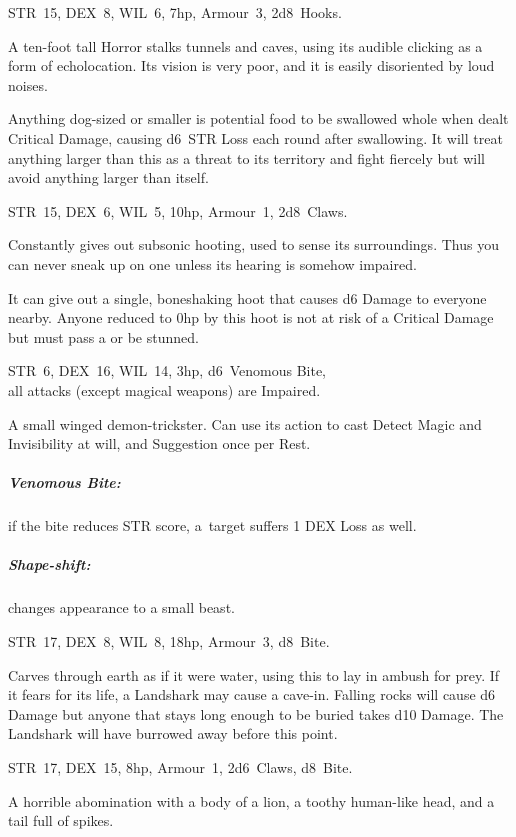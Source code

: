 \documentclass[itdr]{subfiles}
\begin{document}
\vfill

STR~15, DEX~8, WIL~6, 7hp, Armour~3, 2d8~Hooks.

A ten-foot tall Horror stalks tunnels and caves, using its audible clicking as a form of echolocation. Its vision is very poor, and it is easily disoriented by loud noises.

Anything dog-sized or smaller is potential food to be swallowed whole when dealt Critical Damage, causing d6~STR Loss each round after swallowing. It will treat anything larger than this as a threat to its territory and fight fiercely but will avoid anything larger than itself.

\vfill

STR~15, DEX~6, WIL~5, 10hp, Armour~1, 2d8~Claws.

Constantly gives out subsonic hooting, used to sense its surroundings. Thus you can never sneak up on one unless its hearing is somehow impaired.

It can give out a single, boneshaking hoot that causes d6 Damage to everyone nearby. Anyone reduced to 0hp by this hoot is not at risk of a Critical Damage but must pass a  or be stunned.

\vfill

STR~6, DEX~16, WIL~14, 3hp, d6~Venomous Bite,\\all attacks (except magical weapons) are Impaired.

A small winged demon-trickster. Can use its action to cast Detect Magic and Invisibility at will, and Suggestion once per Rest.

\subparagraph{Venomous Bite:} if the bite reduces STR score, \mbox{a target} suffers 1 DEX Loss as well.

\subparagraph{Shape-shift:} changes appearance to a small beast.

\vfill
\break

STR~17, DEX~8, WIL~8, 18hp, Armour~3, d8~Bite.

Carves through earth as if it were water, using this to lay in ambush for prey. If it fears for its life, a Landshark may cause a cave-in. Falling rocks will cause d6 Damage but anyone that stays long enough to be buried takes d10 Damage. The Landshark will have burrowed away before this point.

\vfill

STR~17, DEX~15, 8hp, Armour~1, 2d6~Claws, d8~Bite.

A horrible abomination with a body of a lion, a toothy human-like head, and a tail full of spikes.
\end{document}
